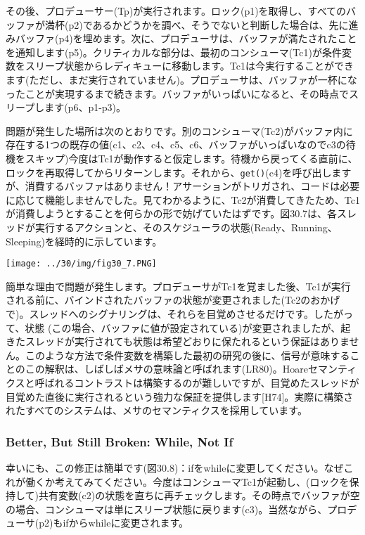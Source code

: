 その後、プロデューサー(Tp)が実行されます。ロック(p1)を取得し、すべてのバッファが満杯(p2)であるかどうかを調べ、そうでないと判断した場合は、先に進みバッファ(p4)を埋めます。次に、プロデューサは、バッファが満たされたことを通知します(p5)。クリティカルな部分は、最初のコンシューマ(Tc1)が条件変数をスリープ状態からレディキューに移動します。Tc1は今実行することができます(ただし、まだ実行されていません)。プロデューサは、バッファが一杯になったことが実現するまで続きます。バッファがいっぱいになると、その時点でスリープします(p6、p1-p3)。

問題が発生した場所は次のとおりです。別のコンシューマ(Tc2)がバッファ内に存在する1つの既存の値(c1、c2、c4、c5、c6、バッファがいっぱいなのでc3の待機をスキップ)今度はTc1が動作すると仮定します。待機から戻ってくる直前に、ロックを再取得してからリターンします。それから、\texttt{get()}(c4)を呼び出しますが、消費するバッファはありません！アサーションがトリガされ、コードは必要に応じて機能しませんでした。見てわかるように、Tc2が消費してきたため、Tc1が消費しようとすることを何らかの形で妨げていたはずです。図30.7は、各スレッドが実行するアクションと、そのスケジューラの状態(Ready、Running、Sleeping)を経時的に示しています。

\texttt{[image: ../30/img/fig30\_7.PNG]}

簡単な理由で問題が発生します。プロデューサがTc1を覚ました後、Tc1が実行される前に、バインドされたバッファの状態が変更されました(Tc2のおかげで)。スレッドへのシグナリングは、それらを目覚めさせるだけです。したがって、状態
(この場合、バッファに値が設定されている)が変更されましたが、起きたスレッドが実行されても状態は希望どおりに保たれるという保証はありません。このような方法で条件変数を構築した最初の研究の後に、信号が意味することのこの解釈は、しばしばメサの意味論と呼ばれます(LR80)。Hoareセマンティクスと呼ばれるコントラストは構築するのが難しいですが、目覚めたスレッドが目覚めた直後に実行されるという強力な保証を提供します{[}H74{]}。実際に構築されたすべてのシステムは、メサのセマンティクスを採用しています。

\hypertarget{better-but-still-broken-while-not-if}{%
\subsubsection*{Better, But Still Broken: While, Not
If}\label{better-but-still-broken-while-not-if}}

幸いにも、この修正は簡単です(図30.8)：ifをwhileに変更してください。なぜこれが働くか考えてみてください。今度はコンシューマTc1が起動し、(ロックを保持して)共有変数(c2)の状態を直ちに再チェックします。その時点でバッファが空の場合、コンシューマは単にスリープ状態に戻ります(c3)。当然ながら、プロデューサ(p2)もifからwhileに変更されます。

